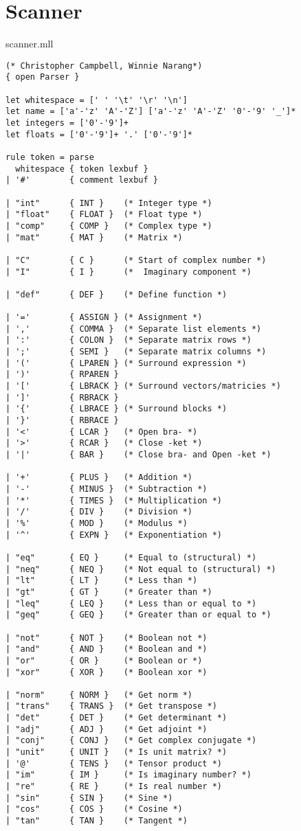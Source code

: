 \section{ Scanner }
scanner.mll
\begin{lstlisting}
(* Christopher Campbell, Winnie Narang*)
{ open Parser }

let whitespace = [' ' '\t' '\r' '\n'] 
let name = ['a'-'z' 'A'-'Z'] ['a'-'z' 'A'-'Z' '0'-'9' '_']*
let integers = ['0'-'9']+
let floats = ['0'-'9']+ '.' ['0'-'9']*

rule token = parse
  whitespace { token lexbuf }
| '#'        { comment lexbuf }

| "int"      { INT }    (* Integer type *)
| "float"    { FLOAT }  (* Float type *)
| "comp"     { COMP }   (* Complex type *)
| "mat"      { MAT }    (* Matrix *)

| "C"        { C }      (* Start of complex number *)
| "I"        { I }      (*  Imaginary component *)

| "def"      { DEF }    (* Define function *)

| '='        { ASSIGN } (* Assignment *)
| ','        { COMMA }  (* Separate list elements *)
| ':'        { COLON }  (* Separate matrix rows *)
| ';'        { SEMI }   (* Separate matrix columns *)
| '('        { LPAREN } (* Surround expression *)
| ')'        { RPAREN } 
| '['        { LBRACK } (* Surround vectors/matricies *)
| ']'        { RBRACK }
| '{'        { LBRACE } (* Surround blocks *)
| '}'        { RBRACE }  
| '<'        { LCAR }   (* Open bra- *)
| '>'        { RCAR }   (* Close -ket *)
| '|'        { BAR }    (* Close bra- and Open -ket *)

| '+'        { PLUS }   (* Addition *)
| '-'        { MINUS }  (* Subtraction *)
| '*'        { TIMES }  (* Multiplication *)
| '/'        { DIV }    (* Division *)
| '%'        { MOD }    (* Modulus *)
| '^'        { EXPN }   (* Exponentiation *)

| "eq"       { EQ }     (* Equal to (structural) *)
| "neq"      { NEQ }    (* Not equal to (structural) *) 
| "lt"       { LT }     (* Less than *)
| "gt"       { GT }     (* Greater than *)
| "leq"      { LEQ }    (* Less than or equal to *)
| "geq"      { GEQ }    (* Greater than or equal to *)

| "not"      { NOT }    (* Boolean not *)
| "and"      { AND }    (* Boolean and *)
| "or"       { OR }     (* Boolean or *)
| "xor"      { XOR }    (* Boolean xor *)

| "norm"     { NORM }   (* Get norm *)
| "trans"    { TRANS }  (* Get transpose *)
| "det"      { DET }    (* Get determinant *) 
| "adj"      { ADJ }    (* Get adjoint *)
| "conj"     { CONJ }   (* Get complex conjugate *)
| "unit"     { UNIT }   (* Is unit matrix? *)
| '@'        { TENS }   (* Tensor product *)
| "im"       { IM }     (* Is imaginary number? *)
| "re"       { RE }     (* Is real number *)
| "sin"      { SIN }    (* Sine *)
| "cos"      { COS }    (* Cosine *)
| "tan"      { TAN }    (* Tangent *)


\end{lstlisting}
